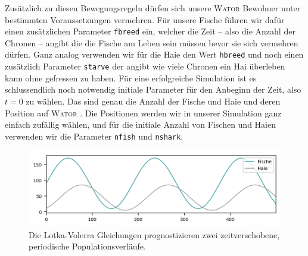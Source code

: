 \documentclass[a4paper,11pt]{article}
\newcommand{\wator}{\textsc{Wator }}
\theoremstyle{definition}
\numberwithin{equation}{section}
\begin{document}
	Zusätzlich zu diesen Bewegungsregeln dürfen sich unsere \wator Bewohner unter bestimmten Voraussetzungen vermehren. Für unsere Fische führen wir dafür einen zusätzlichen Parameter \texttt{fbreed} ein, welcher die Zeit -- also die Anzahl der Chronen -- angibt die die Fische am Leben sein müssen bevor sie sich vermehren dürfen. Ganz analog verwenden wir für die Haie den Wert \texttt{hbreed} und noch einen zusätzlich Parameter \texttt{starve} der angibt wie viele Chronen ein Hai überleben kann ohne gefressen zu haben. Für eine erfolgreiche Simulation ist es schlussendlich noch notwendig initiale Parameter für den Anbeginn der Zeit, also $t = 0$ zu wählen. Das sind genau die Anzahl der Fische und Haie und deren Position auf \wator. Die Positionen werden wir in unserer Simulation ganz einfach zufällig wählen, und für die initiale Anzahl von Fischen und Haien verwenden wir die Parameter \texttt{nfish} und \texttt{nshark}. \newline

	\begin{figure}
		\centering
		\includegraphics[width=\textwidth]{pictures/lotka_volterra.png}
		\caption{Die Lotka-Volerra Gleichungen prognostizieren zwei zeitverschobene, periodische Populationsverläufe.}
		\label{fig:lotka_volterra}
	\end{figure}
\end{document}
